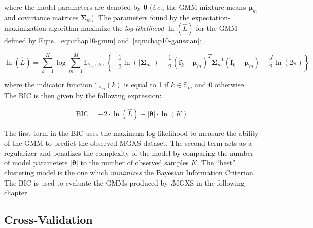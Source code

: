 \noindent where the model parameters are denoted by $\boldsymbol{\theta}$ (\textit{i.e.}, the \ac{GMM} mixture means $\boldsymbol{\mu}_{m}$ and covariance matrices $\boldsymbol{\Sigma}_{m}$). The parameters found by the expectation-maximization algorithm maximize the \textit{log-likelihood} $\ln\left({\hat{L}}\right)$ for the \ac{GMM} defined by Eqns.~\ref{eqn:chap10-gmm} and~\ref{eqn:chap10-gaussian}:

\begin{dmath}
\label{eqn:chap10-log-likelihood-gmm}
\ln(\hat{L}) = \displaystyle\sum\limits_{k=1}^{K} \log \displaystyle\sum\limits_{m=1}^{M} \mathbb{1}_{\mathbb{S}_{m}(k)}\left\{-\frac{1}{2}\ln(|\boldsymbol{\Sigma}_{m}|) - \frac{1}{2}\left(\boldsymbol{\hat{f}}_{k} - \boldsymbol{\mu}_{m}\right)^{T}\boldsymbol{\Sigma}_{m}^{-1}\left(\boldsymbol{\hat{f}}_{k} - \boldsymbol{\mu}_{m}\right) - \frac{J}{2}\ln(2\pi) \right\}
\end{dmath}

\noindent where the indicator function $\mathbb{1}_{\mathbb{S}_{m}}(k)$ is equal to 1 if $k \in \mathbb{S}_{m}$ and 0 otherwise. The BIC is then given by the following expression:

\begin{equation}
\label{eqn:chap10-bic}
\textrm{BIC} = -2 \cdot \ln(\hat{L}) + |\boldsymbol{\theta}| \cdot \ln(K) 
\end{equation}

The first term in the BIC uses the maximum log-likelihood to measure the ability of the \ac{GMM} to predict the observed \ac{MGXS} dataset. The second term acts as a regularizer and penalizes the complexity of the model by comparing the number of model parameters $|\boldsymbol{\theta}|$ to the number of observed samples $K$. The ``best'' clustering model is the one which \textit{minimizes} the Bayesian Information Criterion. The BIC is used to evaluate the \acp{GMM} produced by \textit{i}\ac{MGXS} in the following chapter.

\subsection{Cross-Validation}
\label{subsec:chap10-cross-validate}

